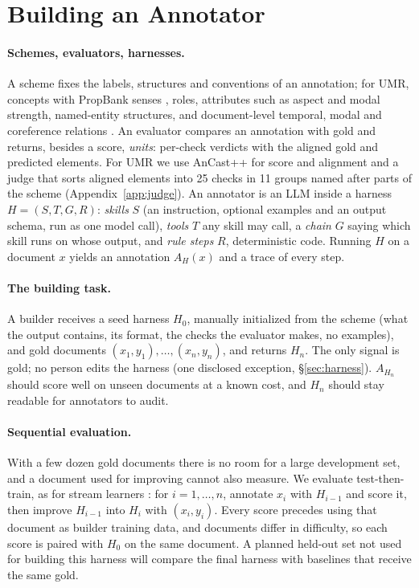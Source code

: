 \section{Building an Annotator}
\label{sec:problem}

\paragraph{Schemes, evaluators, harnesses.}
A scheme fixes the labels, structures and conventions of an annotation; for UMR, concepts with PropBank senses \citep{palmer2005propbank}, roles, attributes such as aspect and modal strength, named-entity structures, and document-level temporal, modal and coreference relations \citep{vangysel2021designing}. An evaluator compares an annotation with gold and returns, besides a score, \emph{units}: per-check verdicts with the aligned gold and predicted elements. For UMR we use AnCast++ \citep{sun2024anchor,sun2025ancastpp} for score and alignment and a judge that sorts aligned elements into 25 checks in 11 groups named after parts of the scheme (Appendix~\ref{app:judge}). An annotator is an LLM inside a harness $H=(S,T,G,R)$: \emph{skills} $S$ (an instruction, optional examples and an output schema, run as one model call), \emph{tools} $T$ any skill may call, a \emph{chain} $G$ saying which skill runs on whose output, and \emph{rule steps} $R$, deterministic code. Running $H$ on a document $x$ yields an annotation $A_H(x)$ and a trace of every step.

\paragraph{The building task.}
A builder receives a seed harness $H_0$, manually initialized from the scheme (what the output contains, its format, the checks the evaluator makes, no examples), and gold documents $(x_1,y_1),\ldots,(x_n,y_n)$, and returns $H_n$. The only signal is gold; no person edits the harness (one disclosed exception, \S\ref{sec:harness}). $A_{H_n}$ should score well on unseen documents at a known cost, and $H_n$ should stay readable for annotators to audit.

\paragraph{Sequential evaluation.}
With a few dozen gold documents there is no room for a large development set, and a document used for improving cannot also measure. We evaluate test-then-train, as for stream learners \citep{dawid1984present,gama2013on}: for $i=1,\ldots,n$, annotate $x_i$ with $H_{i-1}$ and score it, then improve $H_{i-1}$ into $H_i$ with $(x_i,y_i)$. Every score precedes using that document as builder training data, and documents differ in difficulty, so each score is paired with $H_0$ on the same document. A planned held-out set not used for building this harness will compare the final harness with baselines that receive the same gold.
